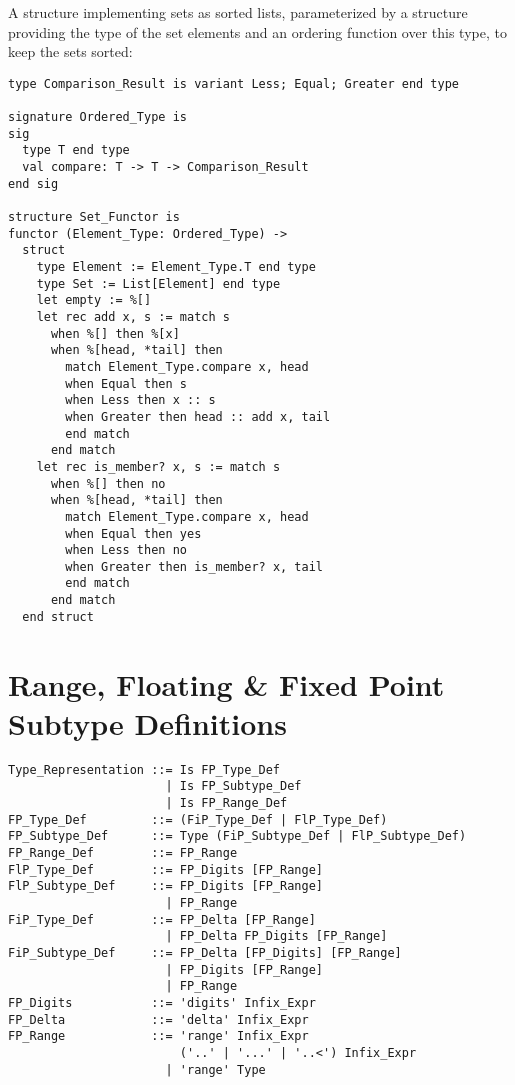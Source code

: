 \example A structure implementing sets as sorted lists, parameterized by a structure providing the type of the set elements and an ordering function over this type, to keep the sets sorted:
\begin{lstlisting}
type Comparison_Result is variant Less; Equal; Greater end type

signature Ordered_Type is
sig
  type T end type
  val compare: T -> T -> Comparison_Result
end sig

structure Set_Functor is
functor (Element_Type: Ordered_Type) ->
  struct
    type Element := Element_Type.T end type
    type Set := List[Element] end type
    let empty := %[]
    let rec add x, s := match s
      when %[] then %[x]
      when %[head, *tail] then 
        match Element_Type.compare x, head
        when Equal then s
        when Less then x :: s
        when Greater then head :: add x, tail
        end match
      end match
    let rec is_member? x, s := match s
      when %[] then no
      when %[head, *tail] then 
        match Element_Type.compare x, head
        when Equal then yes
        when Less then no
        when Greater then is_member? x, tail
        end match
      end match
  end struct
\end{lstlisting}





\section{Range, Floating \& Fixed Point Subtype Definitions}
\label{sec:fl-fi-subtypes}

\syntax\begin{lstlisting}
Type_Representation ::= Is FP_Type_Def 
                      | Is FP_Subtype_Def 
                      | Is FP_Range_Def
FP_Type_Def         ::= (FiP_Type_Def | FlP_Type_Def) 
FP_Subtype_Def      ::= Type (FiP_Subtype_Def | FlP_Subtype_Def) 
FP_Range_Def        ::= FP_Range
FlP_Type_Def        ::= FP_Digits [FP_Range]
FlP_Subtype_Def     ::= FP_Digits [FP_Range]
                      | FP_Range
FiP_Type_Def        ::= FP_Delta [FP_Range] 
                      | FP_Delta FP_Digits [FP_Range]
FiP_Subtype_Def     ::= FP_Delta [FP_Digits] [FP_Range]
                      | FP_Digits [FP_Range]
                      | FP_Range
FP_Digits           ::= 'digits' Infix_Expr
FP_Delta            ::= 'delta' Infix_Expr
FP_Range            ::= 'range' Infix_Expr 
                        ('..' | '...' | '..<') Infix_Expr
                      | 'range' Type
\end{lstlisting}

